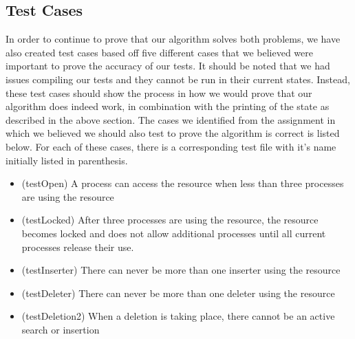 \documentclass[onecolumn, draftclsnofoot,10pt, compsoc]{IEEEtran}
\begin{document}
\begin{singlespace}
\subsection*{Test Cases}
    In order to continue to prove that our algorithm solves both problems, we have also created test cases based off five different cases that we believed were important to prove the accuracy of our tests. It should be noted that we had issues compiling our tests and they cannot be run in their current states. Instead, these test cases should show the process in how we would prove that our algorithm does indeed work, in combination with the printing of the state as described in the above section. The cases we identified from the assignment in which we believed we should also test to prove the algorithm is correct is listed below. For each of these cases, there is a corresponding test file with it's name initially listed in parenthesis.
\begin{itemize}
    \item (testOpen) A process can access the resource when less than three processes are using the resource
    \item (testLocked) After three processes are using the resource, the resource becomes locked and does not allow additional processes until all current processes release their use.
    \item (testInserter) There can never be more than one inserter using the resource
    \item (testDeleter) There can never be more than one deleter using the resource
    \item (testDeletion2) When a deletion is taking place, there cannot be an active search or insertion
\end{itemize}

\end{singlespace}
\end{document}
